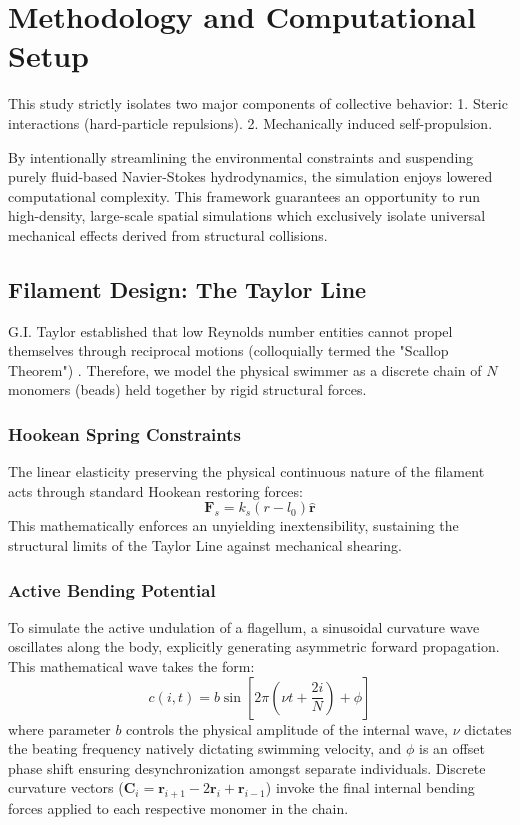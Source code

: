 \documentclass[12pt]{article}
\begin{document}
\section{Methodology and Computational Setup}
This study strictly isolates two major components of collective behavior:
1. Steric interactions (hard-particle repulsions).
2. Mechanically induced self-propulsion.

By intentionally streamlining the environmental constraints and suspending purely ﬂuid-based Navier-Stokes hydrodynamics, the simulation enjoys lowered computational complexity. This framework guarantees an opportunity to run high-density, large-scale spatial simulations which exclusively isolate universal mechanical effects derived from structural collisions.

\subsection{Filament Design: The Taylor Line}
G.I. Taylor established that low Reynolds number entities cannot propel themselves through reciprocal motions (colloquially termed the "Scallop Theorem") \cite{Taylor1951}. Therefore, we model the physical swimmer as a discrete chain of $N$ monomers (beads) held together by rigid structural forces.

\subsubsection{Hookean Spring Constraints}
The linear elasticity preserving the physical continuous nature of the ﬁlament acts through standard Hookean restoring forces:
\begin{equation}
\mathbf{F}_s = k_s(r - l_0)\hat{\mathbf{r}}
\end{equation}
This mathematically enforces an unyielding inextensibility, sustaining the structural limits of the Taylor Line against mechanical shearing.

\subsubsection{Active Bending Potential}
To simulate the active undulation of a flagellum, a sinusoidal curvature wave oscillates along the body, explicitly generating asymmetric forward propagation. This mathematical wave takes the form:
\begin{equation}
c(i, t) = b \sin\left[2\pi\left(\nu t + \frac{2i}{N}\right) + \phi\right]
\end{equation}
where parameter $b$ controls the physical amplitude of the internal wave, $\nu$ dictates the beating frequency natively dictating swimming velocity, and $\phi$ is an offset phase shift ensuring desynchronization amongst separate individuals. Discrete curvature vectors ($\mathbf{C}_i = \mathbf{r}_{i+1} - 2\mathbf{r}_i + \mathbf{r}_{i-1}$) invoke the final internal bending forces applied to each respective monomer in the chain.
\end{document}
